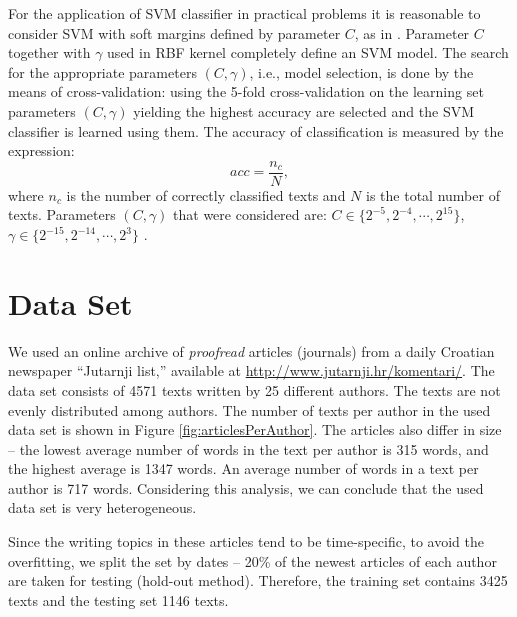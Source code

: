 \documentclass{llncs}
\begin{document}
For the application of SVM classifier in practical problems it is reasonable to
consider SVM with soft margins defined by parameter $C$, as in
\cite{cortes1995support}. Parameter $C$ together with $\gamma$ used in RBF kernel
completely define an SVM model. The search for the appropriate parameters $(C,
\gamma)$, i.e., model selection, is done by the means of cross-validation: using
the 5-fold cross-validation on the learning set parameters $(C, \gamma)$ yielding
the highest accuracy are selected and the SVM classifier is learned using them.
The accuracy of classification is measured by the expression:
\begin{equation}
acc = \frac{n_c}{N}, %
\end{equation}
where $n_c$ is the number of correctly classified texts and $N$ is the total number of
texts.
Parameters $(C, \gamma)$ that were considered are: $C \in \{2^{-5}, 2^{-4},
\cdots , 2^{15}\}$, $\gamma \in \{2^{-15}, 2^{-14}, \cdots, 2^3\}$ \cite{CC01a}.

\section{Data Set}
\label{sec:podatci}
We used an online archive of \emph{proofread} articles (journals) from a daily
Croatian newspaper ``Jutarnji list,'' available at
\url{http://www.jutarnji.hr/komentari/}. The data set consists of 4571 texts
written by 25 different authors. The texts are not evenly distributed among
authors. The number of texts per author in the used data set is shown in Figure
\ref{fig:articlesPerAuthor}. The articles also differ in size -- the lowest
average number of words in the text per author is 315 words, and the highest
average is 1347 words. An average number of words in a text per author is 717
words. Considering this analysis, we can conclude that the used data set is very
heterogeneous.

Since the writing topics in these articles tend to be time-specific, to avoid the
overfitting, we split the set by dates -- 20\% of the newest articles of each author are
taken for testing (hold-out method). Therefore, the training set contains 3425 texts
and the testing set 1146 texts.

\begin{minipage}{0.8\linewidth}
\vspace{10pt}
\centerline{\resizebox{0.7\linewidth}{!}{}}%
%
\label{fig:articlesPerAuthor}
\end{minipage}
\end{document}
